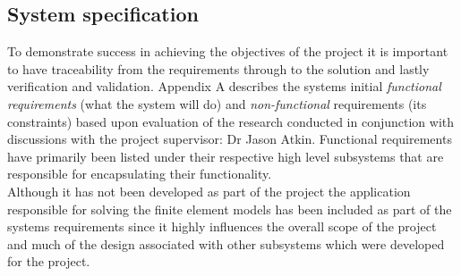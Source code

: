 \subsection{System specification}
To demonstrate success in achieving the objectives of the project it is important to have traceability from the requirements through to the solution and lastly verification and validation. Appendix A describes the systems initial \textit{functional requirements} (what the system will do) and \textit{non-functional} requirements (its constraints) based upon evaluation of the research conducted in conjunction with discussions with the project supervisor: Dr Jason Atkin. Functional requirements have primarily been listed under their respective high level subsystems that are responsible for encapsulating their functionality. \\ 

\noindent
Although it has not been developed as part of the project the application responsible for solving the finite element models has been included as part of the systems requirements since it highly influences the overall scope of the project and much of the design associated with other subsystems which were developed for the project. \\ 